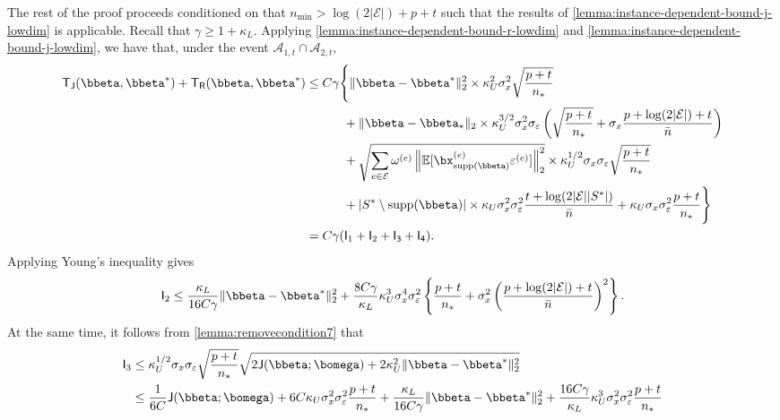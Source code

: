 \documentclass[10pt]{article}
\numberwithin{equation}{section}
\newcommand*{\supp}{\mathrm{supp}}
\begin{document}
The rest of the proof proceeds conditioned on that $n_{\min} > \log(2|\mathcal{E}|) + p + t$ such that the results of \cref{lemma:instance-dependent-bound-j-lowdim} is applicable. Recall that $\gamma \ge 1 + \kappa_L$. Applying \cref{lemma:instance-dependent-bound-r-lowdim} and \cref{lemma:instance-dependent-bound-j-lowdim}, we have that, under the event $\mathcal{A}_{1,t} \cap \mathcal{A}_{2,t}$, 
\begin{align}
\label{eq:low-dim-tj-tr-bound}
\begin{split}
    \mathsf{T}_{\mathsf{J}}(\bbeta, \bbeta^*) + \mathsf{T}_{\mathsf{R}}(\bbeta, \bbeta^*) &\le C\gamma \Bigg\{\|\bbeta - \bbeta^*\|^2_2 \times \kappa_U^2 \sigma_x^2 \sqrt{\frac{p + t}{n_*}} \\
    &~~~~~~~~~ + \|\bbeta - \bbeta_*\|_2 \times \kappa_U^{3/2}\sigma_x^2 \sigma_\varepsilon \left( \sqrt{\frac{p + t}{n_*}} +\sigma_x \frac{p + \log(2|\mathcal{E}|)+t}{\bar{n}}\right)\\
    &~~~~~~~~~ + \sqrt{\sum_{e\in \mathcal{E}} \omega^{(e)} \left\|\mathbb{E} [\bx_{\supp(\bbeta)}^{(e)} \varepsilon^{(e)}]\right\|_2^2} \times \kappa_U^{1/2} \sigma_x \sigma_\varepsilon \sqrt{\frac{p+t}{n_*}}  \\
    &~~~~~~~~~ + |S^*\setminus \supp(\bbeta)| \times \kappa_U \sigma_x^2\sigma_\varepsilon^2  \frac{t+ \log(2|\mathcal{E}||S^*|)}{\bar{n}} + \kappa_U \sigma_x \sigma_\varepsilon^2 \frac{p+t}{n_*} \Bigg\}\\
    &= C\gamma(\mathsf{I}_1 + \mathsf{I}_2 + \mathsf{I_3} + \mathsf{I_4}).
\end{split}
\end{align}
Applying Young's inequality gives
\begin{align}
\label{eq:low-dim-i2}
\mathsf{I}_2 \le \frac{\kappa_L}{16C\gamma} \|\bbeta - \bbeta^*\|^2_2 + \frac{8C\gamma}{\kappa_L} \kappa_U^3 \sigma_x^4 \sigma_\varepsilon^2 \left\{\frac{p + t}{n_*} + \sigma_x^2 \left(\frac{p + \log(2|\mathcal{E}|) + t}{\bar{n}}\right)^2\right\}.
\end{align} 
At the same time, it follows from \cref{lemma:removecondition7} that
\begin{align*}
    \mathsf{I}_3 &\le \kappa_U^{1/2} \sigma_x \sigma_\varepsilon \sqrt{\frac{p + t}{n_*}} \sqrt{2 \mathsf{J}(\bbeta;\bomega) + 2\kappa_U^2 \|\bbeta - \bbeta^*\|_2^2} \\
    &\le \frac{1}{6C} \mathsf{J}(\bbeta; \bomega) + 6C\kappa_U\sigma_x^2 \sigma_\varepsilon^2 \frac{p + t}{n_*} + \frac{\kappa_L}{16C\gamma} \|\bbeta - \bbeta^*\|_2^2 + \frac{16C\gamma}{\kappa_L}\kappa_U^3 \sigma_x^2 \sigma_\varepsilon^2 \frac{p + t}{n_*}
\end{align*}
\end{document}

